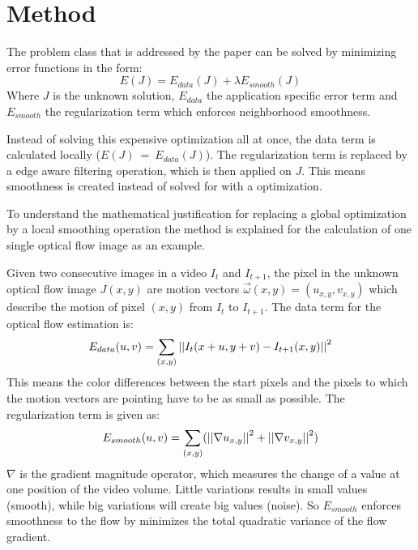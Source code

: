\section{Method} \label{method} The problem class that is addressed by the paper
can be solved by minimizing error functions in the form:
\begin{equation}
  E(J) = E_{data}(J) + \lambda E_{smooth}(J)
  \label{eq:error-function}
\end{equation}
Where $J$ is the unknown solution, $E_{data}$ the application specific error
term and $E_{smooth}$ the regularization term which enforces neighborhood
smoothness.

Instead of solving this expensive optimization all at once, the data term is
calculated locally ($E(J)~=~E_{data}(J)$). The regularization term is replaced
by a edge aware filtering operation, which is then applied on $J$. This means
smoothness is created instead of solved for with a optimization.

To understand the mathematical justification for replacing a global optimization
by a local smoothing operation the method is explained for the calculation of
one single optical flow image as an example.

Given two consecutive images in a video $I_t$ and $I_{t+1}$, the pixel in the
unknown optical flow image $J(x,y)$ are motion vectors $\vec{\omega}(x,y) =
(u_{x,y}, v_{x,y})$ which describe the motion of pixel $(x,y)$ from $I_t$ to
$I_{t+1}$. The data term for the optical flow estimation is:
\begin{equation}
  E_{data}(u, v) = \sum_{(x, y)}\left|\left| I_t(x+ u, y + v) - I_{t+1}(x, y) \right|\right|^{2}
  \label{eq:optical-flow-data}
\end{equation}
This means the color differences between the start pixels and the pixels to
which the motion vectors are pointing have to be as small as possible. The
regularization term is given as:
\begin{equation}
  E_{smooth}(u, v) = \sum_{(x,y)}(\left|\left| \nabla u_{x,y} \right|\right|^2 + \left|\left| \nabla
    v_{x,y} \right|\right|^2)
  \label{eq:optical-flow-smooth}
\end{equation}
$\nabla$ is the gradient magnitude operator, which measures
the change of a value at one position of the video volume. Little variations
results in small values (smooth), while big variations will create big values
(noise). So $E_{smooth}$ enforces smoothness to the flow by minimizes the total
quadratic variance of the flow gradient. 

